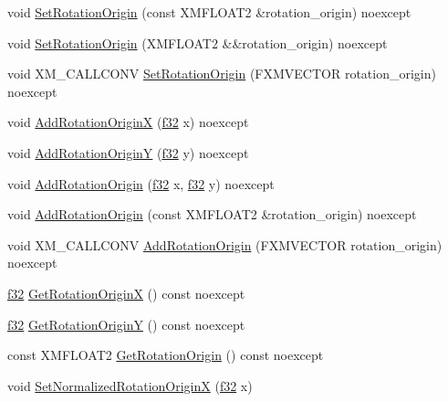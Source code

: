 \begin{DoxyCompactItemize}
\item 
void \hyperlink{structmage_1_1_sprite_transform_a93070ec524ff5828f8040c103dee41a4}{Set\+Rotation\+Origin} (const X\+M\+F\+L\+O\+A\+T2 \&rotation\+\_\+origin) noexcept
\item 
void \hyperlink{structmage_1_1_sprite_transform_a532771d53e650543d125ffb652671388}{Set\+Rotation\+Origin} (X\+M\+F\+L\+O\+A\+T2 \&\&rotation\+\_\+origin) noexcept
\item 
void X\+M\+\_\+\+C\+A\+L\+L\+C\+O\+NV \hyperlink{structmage_1_1_sprite_transform_acbb3eebc3fd26d616f5e4ca75a8c112b}{Set\+Rotation\+Origin} (F\+X\+M\+V\+E\+C\+T\+OR rotation\+\_\+origin) noexcept
\item 
void \hyperlink{structmage_1_1_sprite_transform_a08d35932c6033b681d04dc5f3074955a}{Add\+Rotation\+OriginX} (\hyperlink{namespacemage_a6a44ad388483959dc4dff9f2aef91431}{f32} x) noexcept
\item 
void \hyperlink{structmage_1_1_sprite_transform_a2f28926ff331cc6da8bca11e1f13e341}{Add\+Rotation\+OriginY} (\hyperlink{namespacemage_a6a44ad388483959dc4dff9f2aef91431}{f32} y) noexcept
\item 
void \hyperlink{structmage_1_1_sprite_transform_a1dce8e3f578d474fb871d0e7a537540d}{Add\+Rotation\+Origin} (\hyperlink{namespacemage_a6a44ad388483959dc4dff9f2aef91431}{f32} x, \hyperlink{namespacemage_a6a44ad388483959dc4dff9f2aef91431}{f32} y) noexcept
\item 
void \hyperlink{structmage_1_1_sprite_transform_a540e9757575ce46edcfea9ea5dcac19b}{Add\+Rotation\+Origin} (const X\+M\+F\+L\+O\+A\+T2 \&rotation\+\_\+origin) noexcept
\item 
void X\+M\+\_\+\+C\+A\+L\+L\+C\+O\+NV \hyperlink{structmage_1_1_sprite_transform_a8f1ce16eb9c07a4f798e93bf58eb2b46}{Add\+Rotation\+Origin} (F\+X\+M\+V\+E\+C\+T\+OR rotation\+\_\+origin) noexcept
\item 
\hyperlink{namespacemage_a6a44ad388483959dc4dff9f2aef91431}{f32} \hyperlink{structmage_1_1_sprite_transform_a52b7e1b0d4adb2322068676acfc36547}{Get\+Rotation\+OriginX} () const noexcept
\item 
\hyperlink{namespacemage_a6a44ad388483959dc4dff9f2aef91431}{f32} \hyperlink{structmage_1_1_sprite_transform_a991e4d01dd757907766f1d93fdaeae2a}{Get\+Rotation\+OriginY} () const noexcept
\item 
const X\+M\+F\+L\+O\+A\+T2 \hyperlink{structmage_1_1_sprite_transform_aa7a6f3cad38ed9231455de722e60040c}{Get\+Rotation\+Origin} () const noexcept
\item 
void \hyperlink{structmage_1_1_sprite_transform_ad87c6ec1e27ab870b13478dcf718f3bd}{Set\+Normalized\+Rotation\+OriginX} (\hyperlink{namespacemage_a6a44ad388483959dc4dff9f2aef91431}{f32} x)

\end{DoxyCompactItemize}
